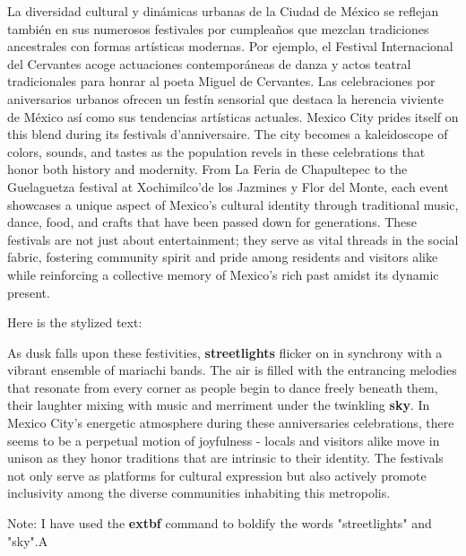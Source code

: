 \documentclass[12pt, a4paper]{article}
\begin{document}
La diversidad cultural y dinámicas urbanas de la Ciudad de México se reflejan también en sus numerosos festivales por cumpleaños que mezclan tradiciones ancestrales con formas artísticas modernas. Por ejemplo, el Festival Internacional del Cervantes acoge actuaciones contemporáneas de danza y actos teatral tradicionales para honrar al poeta Miguel de Cervantes. Las celebraciones por aniversarios urbanos ofrecen un festín sensorial que destaca la herencia viviente de México así como sus tendencias artísticas actuales.
Mexico City prides itself on this blend during its festivals d’anniversaire. The city becomes a kaleidoscope of colors, sounds, and tastes as the population revels in these celebrations that honor both history and modernity. From La Feria de Chapultepec to the Guelaguetza festival at Xochimilco'de los Jazmines y Flor del Monte, each event showcases a unique aspect of Mexico’s cultural identity through traditional music, dance, food, and crafts that have been passed down for generations. These festivals are not just about entertainment; they serve as vital threads in the social fabric, fostering community spirit and pride among residents and visitors alike while reinforcing a collective memory of Mexico’s rich past amidst its dynamic present.

Here is the stylized text:

As dusk falls upon these festivities, \textbf{streetlights} flicker on in synchrony with a vibrant ensemble of mariachi bands. The air is filled with the entrancing melodies that resonate from every corner as people begin to dance freely beneath them, their laughter mixing with music and merriment under the twinkling \textbf{sky}. In Mexico City's energetic atmosphere during these anniversaries celebrations, there seems to be a perpetual motion of joyfulness - locals and visitors alike move in unison as they honor traditions that are intrinsic to their identity. The festivals not only serve as platforms for cultural expression but also actively promote inclusivity among the diverse communities inhabiting this metropolis.

Note: I have used the \textbf{extbf} command to boldify the words "streetlights" and "sky".A

  
\end{document}
